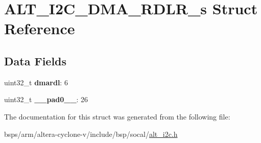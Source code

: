 \hypertarget{structALT__I2C__DMA__RDLR__s}{}\section{A\+L\+T\+\_\+\+I2\+C\+\_\+\+D\+M\+A\+\_\+\+R\+D\+L\+R\+\_\+s Struct Reference}
\label{structALT__I2C__DMA__RDLR__s}
\subsection*{Data Fields}
\begin{DoxyCompactItemize}
\item 
\mbox{\label{structALT__I2C__DMA__RDLR__s_a48cae061b652103abd68883b9536f27e}} 
uint32\+\_\+t {\bfseries dmardl}\+: 6
\item 
\mbox{\label{structALT__I2C__DMA__RDLR__s_a0ff06b3e2793008efa534c8a4890d12c}} 
uint32\+\_\+t {\bfseries \+\_\+\+\_\+pad0\+\_\+\+\_\+}\+: 26
\end{DoxyCompactItemize}


The documentation for this struct was generated from the following file\+:\begin{DoxyCompactItemize}
\item 
bsps/arm/altera-\/cyclone-\/v/include/bsp/socal/\mbox{\hyperlink{socal_2alt__i2c_8h}{alt\+\_\+i2c.\+h}}\end{DoxyCompactItemize}
